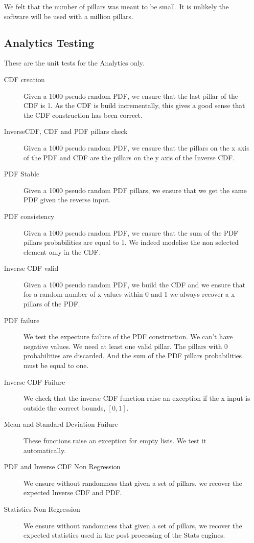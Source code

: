 \documentclass[12pt,a4paper,article]{memoir} %
\begin{document}
We felt that the number of pillars was meant to be small. It is unlikely
the software will be used with a million pillars. 

\subsection{Analytics Testing} 
These are the unit tests for the Analytics only.
\begin{description}
	\item [CDF creation]
		Given a 1000 pseudo random PDF, we ensure 
		that the last pillar of the CDF is 1.
		As the CDF is build incrementally, this gives a good sense that
		the CDF construction has been correct.
	\item [InverseCDF, CDF and PDF pillars check]
		Given a 1000 pseudo random PDF, we ensure that
		the pillars on the x axis of the PDF and CDF are the pillars on the y
		axis of the Inverse CDF.
	\item [PDF Stable]
		Given a 1000 pseudo random PDF pillars, 
		we ensure that we get the same PDF given the reverse input.
	\item [PDF consistency]
		Given a 1000 pseudo random PDF, 
		we ensure that the sum of the PDF pillars probabilities are 
		equal to 1. We indeed modelise the non selected element
		only in the CDF.
	\item [Inverse CDF valid]
		Given a 1000 pseudo random PDF,
		we build the CDF and we ensure that for a random number of
		x values within 0 and 1 we always recover a x pillars of the PDF.
	\item [PDF failure]
		We test the expecture failure of the PDF construction. 
		We can't have negative values. We need at least one valid pillar.
		The pillars with 0 probabilities are discarded.
		And the sum of the PDF pillars probabilities must be 
		equal to one.
	\item [Inverse CDF Failure]
		We check that the inverse CDF function raise an
		exception if the x input is outside the correct bounds, 
		$\left[0, 1\right]$.
	\item [Mean and Standard Deviation Failure]
		These functions raise an exception for empty lists.
		We test it automatically.
	\item [PDF and Inverse CDF Non Regression]
		We ensure without randomness that given a set of pillars,
		we recover the expected Inverse CDF and PDF.
	\item [Statistics Non Regression]
		We ensure without randomness that given a set of pillars,
		we recover the expected statistics used in the post processing
		of the Stats engines.
\end{description}
\end{document}
